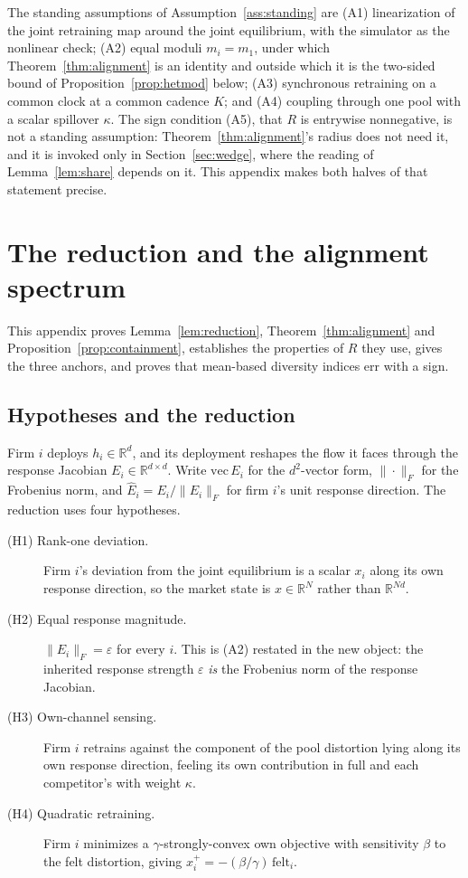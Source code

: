 
The standing assumptions of Assumption~\ref{ass:standing} are (A1) linearization of the joint retraining map around the joint equilibrium, with the simulator as the nonlinear check; (A2) equal moduli $m_i = m_1$, under which Theorem~\ref{thm:alignment} is an identity and outside which it is the two-sided bound of Proposition~\ref{prop:hetmod} below; (A3) synchronous retraining on a common clock at a common cadence $K$; and (A4) coupling through one pool with a scalar spillover $\kappa$. The sign condition (A5), that $R$ is entrywise nonnegative, is not a standing assumption: Theorem~\ref{thm:alignment}'s radius does not need it, and it is invoked only in Section~\ref{sec:wedge}, where the reading of Lemma~\ref{lem:share} depends on it. This appendix makes both halves of that statement precise.

\section{The reduction and the alignment spectrum}
\label{app:alignment}

This appendix proves Lemma~\ref{lem:reduction}, Theorem~\ref{thm:alignment} and Proposition~\ref{prop:containment}, establishes the properties of $R$ they use, gives the three anchors, and proves that mean-based diversity indices err with a sign.

\subsection{Hypotheses and the reduction}

Firm $i$ deploys $h_i \in \mathbb{R}^d$, and its deployment reshapes the flow it faces through the response Jacobian $E_i \in \mathbb{R}^{d\times d}$. Write $\mathrm{vec}\, E_i$ for the $d^2$-vector form, $\|\cdot\|_F$ for the Frobenius norm, and $\hat{E}_i = E_i/\|E_i\|_F$ for firm $i$'s unit response direction. The reduction uses four hypotheses.

\begin{description}
\item[(H1) Rank-one deviation.] Firm $i$'s deviation from the joint equilibrium is a scalar $x_i$ along its own response direction, so the market state is $x \in \mathbb{R}^N$ rather than $\mathbb{R}^{Nd}$.
\item[(H2) Equal response magnitude.] $\|E_i\|_F = \varepsilon$ for every $i$. This is (A2) restated in the new object: the inherited response strength $\varepsilon$ \emph{is} the Frobenius norm of the response Jacobian.
\item[(H3) Own-channel sensing.] Firm $i$ retrains against the component of the pool distortion lying along its own response direction, feeling its own contribution in full and each competitor's with weight $\kappa$.
\item[(H4) Quadratic retraining.] Firm $i$ minimizes a $\gamma$-strongly-convex own objective with sensitivity $\beta$ to the felt distortion, giving $x_i^{+} = -(\beta/\gamma)\,\mathrm{felt}_i$.
\end{description}

